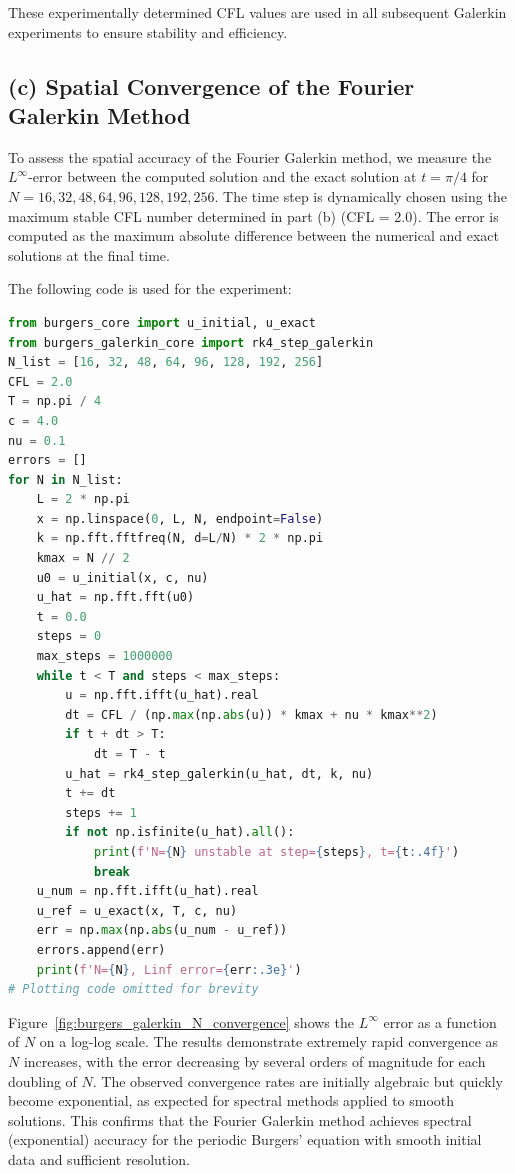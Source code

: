 \documentclass{article}
\begin{document}
These experimentally determined CFL values are used in all subsequent Galerkin experiments to ensure stability and efficiency.

\subsection*{(c) Spatial Convergence of the Fourier Galerkin Method}
To assess the spatial accuracy of the Fourier Galerkin method, we measure the $L^\infty$-error between the computed solution and the exact solution at $t = \pi/4$ for $N = 16, 32, 48, 64, 96, 128, 192, 256$. The time step is dynamically chosen using the maximum stable CFL number determined in part (b) (CFL = 2.0). The error is computed as the maximum absolute difference between the numerical and exact solutions at the final time.

The following code is used for the experiment:

\begin{lstlisting}[language=Python]
from burgers_core import u_initial, u_exact
from burgers_galerkin_core import rk4_step_galerkin
N_list = [16, 32, 48, 64, 96, 128, 192, 256]
CFL = 2.0
T = np.pi / 4
c = 4.0
nu = 0.1
errors = []
for N in N_list:
    L = 2 * np.pi
    x = np.linspace(0, L, N, endpoint=False)
    k = np.fft.fftfreq(N, d=L/N) * 2 * np.pi
    kmax = N // 2
    u0 = u_initial(x, c, nu)
    u_hat = np.fft.fft(u0)
    t = 0.0
    steps = 0
    max_steps = 1000000
    while t < T and steps < max_steps:
        u = np.fft.ifft(u_hat).real
        dt = CFL / (np.max(np.abs(u)) * kmax + nu * kmax**2)
        if t + dt > T:
            dt = T - t
        u_hat = rk4_step_galerkin(u_hat, dt, k, nu)
        t += dt
        steps += 1
        if not np.isfinite(u_hat).all():
            print(f'N={N} unstable at step={steps}, t={t:.4f}')
            break
    u_num = np.fft.ifft(u_hat).real
    u_ref = u_exact(x, T, c, nu)
    err = np.max(np.abs(u_num - u_ref))
    errors.append(err)
    print(f'N={N}, Linf error={err:.3e}')
# Plotting code omitted for brevity
\end{lstlisting}

Figure~\ref{fig:burgers_galerkin_N_convergence} shows the $L^\infty$ error as a function of $N$ on a log-log scale. The results demonstrate extremely rapid convergence as $N$ increases, with the error decreasing by several orders of magnitude for each doubling of $N$. The observed convergence rates are initially algebraic but quickly become exponential, as expected for spectral methods applied to smooth solutions. This confirms that the Fourier Galerkin method achieves spectral (exponential) accuracy for the periodic Burgers' equation with smooth initial data and sufficient resolution.
\end{document}
